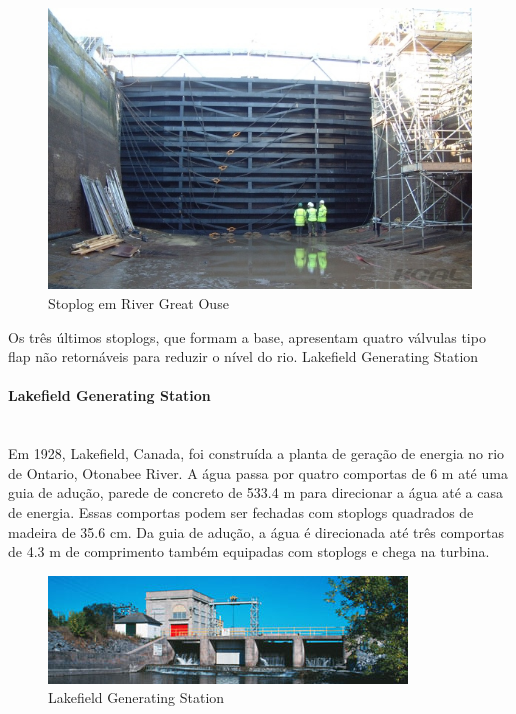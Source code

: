 \begin{figure}[H]
    \centering
    \includegraphics[width=1\columnwidth]{figs/pesqbib/2.jpg}
    \caption{Stoplog em River Great Ouse}
    \label{pesqbib_2}
\end{figure}
 
Os três últimos stoplogs, que formam a base, apresentam quatro válvulas tipo flap não retornáveis para reduzir o nível do rio. 
Lakefield Generating Station

\paragraph{Lakefield Generating Station}\mbox{}\\
Em 1928, Lakefield, Canada, foi construída a planta de geração de energia no rio
de Ontario, Otonabee River. A água passa por quatro comportas de 6 m até uma
guia de adução, parede de concreto de 533.4 m para direcionar a água até a casa
de energia. Essas comportas podem ser fechadas com stoplogs quadrados de madeira de 35.6 cm. Da guia de adução, a água é direcionada até três comportas de 4.3 m de comprimento também equipadas com stoplogs e chega na turbina.

\begin{figure}[H]
    \centering
    \includegraphics[width=1\columnwidth]{figs/pesqbib/3.jpg}
    \caption{Lakefield Generating Station}
    \label{pesqbib_3}
\end{figure}
 
